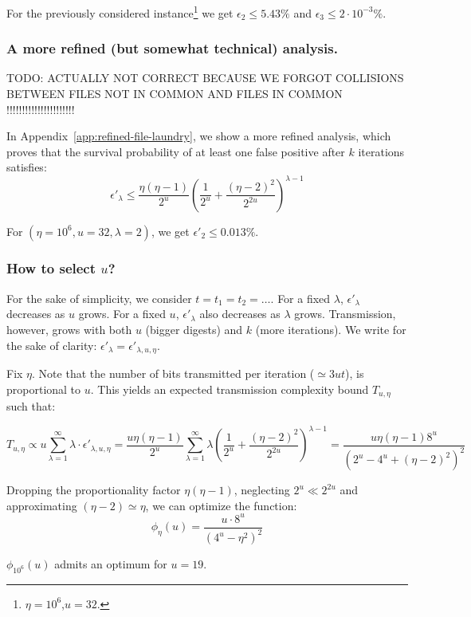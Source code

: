 \documentclass[11pt]{llncs}
\begin{document}
For the previously considered instance\footnote{$\eta=10^6$,$u=32$.} we get $\epsilon_2 \le 5.43\%$ and $\epsilon_3 \le 2 \cdot 10^{-3}\%$.

\subsubsection{A more refined (but somewhat technical) analysis.}
TODO: ACTUALLY NOT CORRECT BECAUSE WE FORGOT COLLISIONS BETWEEN FILES NOT IN COMMON AND FILES IN COMMON !!!!!!!!!!!!!!!!!!!!!!

In Appendix~\ref{app:refined-file-laundry}, we show a more refined analysis, which proves that  the survival probability of at least one false positive after $k$ iterations satisfies:
\[
\epsilon'_\lambda \le \frac{\eta(\eta-1)}{2^u} \left( \frac{1}{2^u} + \frac{(\eta-2)^2}{2^{2u}} \right)^{\lambda-1}
\]

For $(\eta=10^6,u=32,\lambda=2)$, we get $\epsilon'_2 \le 0.013\%$.


\subsubsection{How to select $u$?}
%
For the sake of simplicity, we consider $t=t_1=t_2=\dots$.
For a fixed $\lambda$, $\epsilon'_\lambda$ decreases as $u$ grows. For a fixed $u$, $\epsilon'_\lambda$ also decreases as $\lambda$ grows. Transmission, however, grows with both $u$ (bigger digests) and $k$ (more iterations). We write for the sake of clarity: $\epsilon'_\lambda = \epsilon'_{\lambda,u,\eta}$.

Fix $\eta$. Note that the number of bits transmitted per iteration ($\simeq 3ut$), is proportional to $u$. This yields an expected transmission complexity bound $T_{u,\eta}$ such that:

\[T_{u,\eta} \propto u \sum_{\lambda=1}^{\infty} \lambda \cdot \epsilon'_{\lambda,u,\eta}=
\frac{u \eta\left(\eta-1\right)}{2^u} \sum_{\lambda=1}^{\infty} \lambda \left( \frac{1}{2^u} + \frac{\left(\eta-2\right)^2}{2^{2u}} \right)^{\lambda-1}=
\frac{u \eta\left(\eta-1\right) 8^u}{\left(2^u-4^u+\left(\eta-2\right)^2\right)^2}\]

Dropping the proportionality factor $\eta\left(\eta-1\right)$, neglecting $2^u \ll 2^{2u}$ and approximating $(\eta-2)\simeq\eta$, we can optimize the function:
\nopagebreak
\[
\phi_\eta(u)=\frac{u \cdot 8^u}{\left(4^u-\eta^2\right)^2}
\]

$\phi_{10^6}(u)$ admits an optimum for $u=19$.
\end{document}

